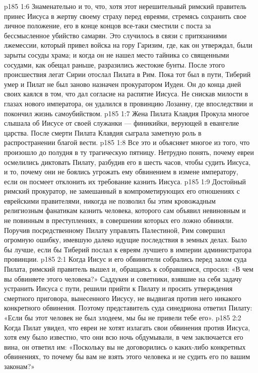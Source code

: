 \vs p185 1:6 \pc Знаменательно и то, что, хотя этот нерешительный римский правитель принес Иисуса в жертву своему страху перед евреями, стремясь сохранить свое личное положение, его в конце концов все\hyp{}таки сместили с поста за бессмысленное убийство самарян. Это случилось в связи с притязаниями лжемессии, который привел войска на гору Гаризим, где, как он утверждал, были зарыты сосуды храма; и когда он не нашел место тайника со священными сосудами, как обещал раньше, разразились жестокие бунты. После этого происшествия легат Сирии отослал Пилата в Рим. Пока тот был в пути, Тиберий умер и Пилат не был заново назначен прокуратором Иудеи. Он до конца дней своих каялся в том, что дал согласие на распятие Иисуса. Не снискав милости в глазах нового императора, он удалился в провинцию Лозанну, где впоследствии и покончил жизнь самоубийством.
\vs p185 1:7 \pc Жена Пилата Клавдия Прокула многое слышала об Иисусе от своей служанки --- финикийки, верующей в евангелие царства. После смерти Пилата Клавдия сыграла заметную роль в распространении благой вести.
\vs p185 1:8 \pc Все это и объясняет многое из того, что произошло до полудня в ту трагическую пятницу. Нетрудно понять, почему евреи осмелились диктовать Пилату, разбудив его в шесть часов, чтобы судить Иисуса, и то, почему они не боялись угрожать ему обвинением в измене императору, если он посмеет отклонить их требование казнить Иисуса.
\vs p185 1:9 Достойный римский прокуратор, не замешанный в компрометирующих его отношениях с еврейскими правителями, никогда не позволил бы этим кровожадным религиозным фанатикам казнить человека, которого сам объявил невиновным и не повинным в преступлениях, в совершении которых его ложно обвиняли. Поручив посредственному Пилату управлять Палестиной, Рим совершил огромную ошибку, имевшую далеко идущие последствия в земных делах. Было бы лучше, если бы Тиберий послал к евреям лучшего в империи администратора провинции.
\vs p185 2:1 Когда Иисус и его обвинители собрались перед залом суда Пилата, римский правитель вышел и, обращаясь к собравшимся, спросил: «В чем вы обвиняете этого человека?» Саддукеи и советники, взявшие на себя задачу устранить Иисуса с пути, решили прийти к Пилату и просить утверждения смертного приговора, вынесенного Иисусу, не выдвигая против него никакого конкретного обвинения. Поэтому представитель суда синедриона ответил Пилату: «Если бы этот человек не был злодеем, мы бы не привели тебе его».
\vs p185 2:2 Когда Пилат увидел, что евреи не хотят излагать свои обвинения против Иисуса, хотя ему было известно, что они всю ночь обдумывали, в чем заключается его вина, он ответил им: «Поскольку вы не договорились о каких\hyp{}либо конкретных обвинениях, то почему бы вам не взять этого человека и не судить его по вашим законам?»
